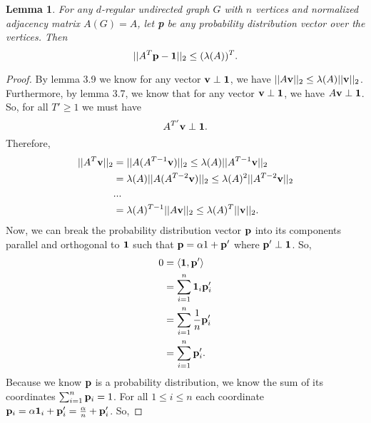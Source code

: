 \documentclass[psamsfonts, 10pt]{amsart}
\newtheorem{lem}[thm]{Lemma}
\theoremstyle{definition}
\theoremstyle{remark}
\numberwithin{equation}{section}
\begin{document}
\iffalse
\begin{lem}
$\lambda(A) = \lvert \lambda_2 \rvert$, where $\lambda_2$ is the second largest absolute valued eigenvalue of $A(G)$.
\end{lem}
\begin{proof}
hi
\end{proof}
\fi


\begin{lem}
For any $d$-regular undirected graph $G$ with $n$ vertices and normalized adjacency matrix $A(G) = A$, let {\bf p} be any probability distribution vector over the vertices. Then
\[
\lvert\lvert A^T{\bf p}-{\bf 1}\rvert \rvert_2 \leq (\lambda(A))^T.
\]
\end{lem}
\begin{proof}
By lemma 3.9 we know for any vector ${\bf v} \perp {\bf 1}$,  we have $\lvert \lvert A{\bf v} \rvert \rvert_2 \leq \lambda(A)\lvert\lvert {\bf v} \rvert \rvert_2$. Furthermore, by lemma 3.7, we know that for any vector ${\bf v} \perp {\bf 1}$, we have $A{\bf v} \perp {\bf 1}$. So, for all $T' \geq 1$ we must have
\[
A^{T'}{\bf v} \perp {\bf 1}.
\]
Therefore, 
\[
\begin{aligned}
\lvert \lvert A^T {\bf v} \rvert \rvert _2 &= \lvert \lvert A (A^{T-1}{\bf  v}) \rvert \rvert _2 \leq \lambda(A)\lvert \lvert A^{T-1}{\bf  v} \rvert \rvert _2\\
&=\lambda(A)\lvert \lvert A (A^{T-2}{\bf  v}) \rvert \rvert _2 \leq \lambda(A)^2\lvert \lvert A^{T-2}{\bf  v} \rvert\rvert_2\\
& ...\\
&=\lambda(A)^{T-1}\lvert \lvert A{\bf  v} \rvert \rvert _2 \leq \lambda(A)^T\lvert \lvert {\bf  v} \rvert\rvert_2.\\
\end{aligned}
\]
Now, we can break the probability distribution vector  ${\bf p}$ into its components parallel and orthogonal to ${\bf 1}$ such that ${\bf p} = \alpha{1} + {\bf p}'$ where ${\bf p}' \perp {\bf 1}$. So,
\[
\begin{aligned}
0 &=  \langle {\bf 1}, {\bf p}' \rangle\\
&= \sum_{i=1}^n {\bf 1}_i{\bf p}'_i\\
&= \sum_{i=1}^n \frac{1}{n}{\bf p}'_i\\
&= \sum_{i=1}^n{\bf p}'_i.\\
 \end{aligned}
\]
Because we know ${\bf p}$ is a probability distribution, we know the sum of its coordinates $\sum_{i=1}^n {\bf p}_i = 1$. For all $1 \leq i \leq n$ each coordinate ${\bf p}_i = \alpha{\bf 1}_i + {\bf p}'_i = \frac{\alpha}{n} + {\bf p}'_i$. So,

\end{proof}
\end{document}
